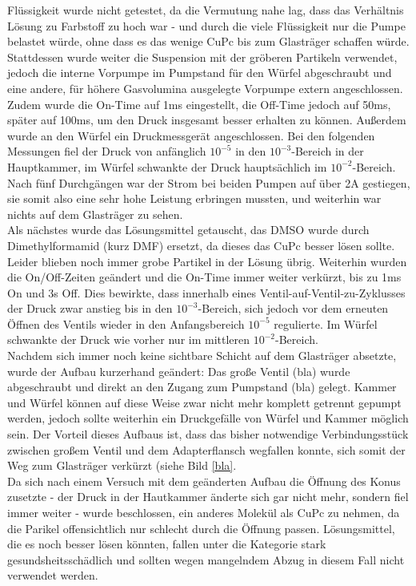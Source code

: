 Flüssigkeit wurde nicht getestet, da die Vermutung nahe lag, dass das Verhältnis Lösung zu Farbstoff zu hoch
war - und durch die viele Flüssigkeit nur die Pumpe belastet würde, ohne dass es das wenige CuPc bis zum
Glasträger schaffen würde.\\
Stattdessen wurde weiter die Suspension mit der gröberen Partikeln verwendet, jedoch die interne Vorpumpe im
Pumpstand für den Würfel abgeschraubt und eine andere, für höhere Gasvolumina ausgelegte Vorpumpe extern
angeschlossen. Zudem wurde die On-Time auf 1ms eingestellt, die Off-Time jedoch auf 50ms, später auf 100ms, um
den Druck insgesamt besser erhalten zu können. Außerdem wurde an den Würfel ein Druckmessgerät angeschlossen.
Bei den folgenden Messungen fiel der Druck von anfänglich $10^{-5}$ in den $10^{-3}$-Bereich in der
Hauptkammer, im Würfel schwankte der Druck hauptsächlich im $10^{-2}$-Bereich. Nach fünf Durchgängen war der
Strom bei beiden Pumpen auf über 2A gestiegen, sie somit also eine sehr hohe Leistung erbringen mussten, und
weiterhin war nichts auf dem Glasträger zu sehen.\\
Als nächstes wurde das Lösungsmittel getauscht, das DMSO wurde durch Dimethylformamid (kurz DMF) ersetzt,
da dieses das CuPc besser lösen sollte. Leider blieben noch immer grobe Partikel in der Lösung übrig. Weiterhin
wurden die On/Off-Zeiten geändert und die On-Time immer weiter verkürzt, bis zu 1ms On und 3s Off. Dies
bewirkte, dass innerhalb eines Ventil-auf-Ventil-zu-Zyklusses der Druck zwar anstieg bis in den
$10^{-3}$-Bereich, sich jedoch vor dem erneuten Öffnen des Ventils wieder in den Anfangsbereich $10^{-5}$
regulierte. Im Würfel schwankte der Druck wie vorher nur im mittleren $10^{-2}$-Bereich.\\
Nachdem sich immer noch keine sichtbare Schicht auf dem Glasträger absetzte, wurde der Aufbau kurzerhand
geändert: Das große Ventil (bla) wurde abgeschraubt und direkt an den Zugang zum Pumpstand (bla) gelegt.
Kammer und Würfel können auf diese Weise zwar nicht mehr komplett getrennt gepumpt werden, jedoch sollte
weiterhin ein Druckgefälle von Würfel und Kammer möglich sein. Der Vorteil dieses Aufbaus ist, dass das bisher
notwendige Verbindungsstück zwischen großem Ventil und dem Adapterflansch wegfallen konnte, sich somit der Weg
zum Glasträger verkürzt (siehe Bild \ref{bla}. \\
 Da sich nach einem Versuch mit dem geänderten Aufbau die Öffnung des Konus zusetzte - der Druck in der
 Hautkammer änderte sich gar nicht mehr, sondern fiel immer weiter - wurde beschlossen, ein anderes Molekül als CuPc zu nehmen, da die
Parikel offensichtlich nur schlecht durch die Öffnung passen. Lösungsmittel, die es noch besser lösen könnten,
fallen unter die Kategorie stark gesundsheitsschädlich und sollten wegen mangelndem Abzug in diesem Fall nicht
verwendet werden.



